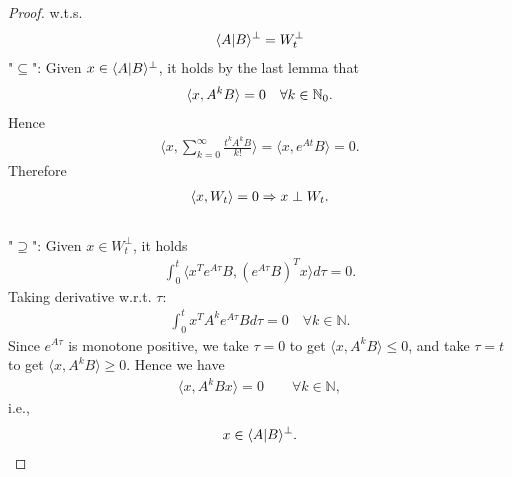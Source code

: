 \documentclass[a4paper,11pt,fleqn]{book}
\theoremstyle{definition}
\theoremstyle{remark}
\let\ran\relax
\DeclareMathOperator{\ran}{ran}
\begin{document}
\begin{proof}
w.t.s. 
\begin{align*}
	\langle A| \ran B\rangle^\perp = W_t^\perp
\end{align*}
"$\subseteq$": Given $x \in \langle A|\ran B \rangle^\perp$, it holds by the last lemma that
\begin{align*}
	\langle x, \ran A^kB \rangle = 0 \quad \forall k \in \mathbb{N}_0. 
\end{align*}
Hence
\begin{align*}
	\langle x, \sum_{k = 0}^\infty \frac{t^k A^k B}{k!}  \rangle = \langle x, e^{At} B  \rangle = 0.
\end{align*}
Therefore
\begin{align*}
	\langle x, W_t\rangle = 0 \Rightarrow x \perp \ran W_t. 
\end{align*}
\quad\\
"$\supseteq$": Given $x \in W_t^\perp$, it holds
\begin{align*}
	\int_0^t \langle x^T e^{A\tau} B, (e^{A\tau}B)^T x \rangle  d\tau = 0. 
\end{align*}
Taking derivative w.r.t. $\tau$:
\begin{align*}
	\int_0^t x^T A^k e^{A\tau} B d\tau = 0 \quad \forall k \in \mathbb{N}. 
\end{align*}
Since $e^{A\tau}$ is monotone positive, we take $\tau = 0$ to get $\langle x, A^kB\rangle \le 0$, and take $\tau = t$ to get $\langle x, A^k B \rangle \ge 0$. Hence we have 
\begin{align*}
	\langle x, A^k B x \rangle = 0 \qquad \forall k \in \mathbb{N},  
\end{align*}
i.e., 
\begin{align*}
	x \in \langle A| \ran B\rangle^\perp. 
\end{align*}
\end{proof}
\end{document}
